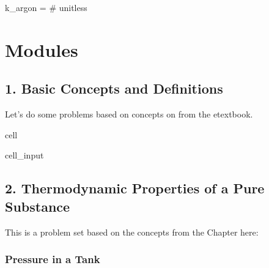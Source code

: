 \documentclass[letterpaper,10pt,english]{jupyterBook}
\begin{document}
\sphinxAtStartPar
k\_argon =   \# unitless

\sphinxstepscope


\part{Modules}

\sphinxstepscope


\chapter{1. Basic Concepts and Definitions}
\label{\detokenize{notebooks/Chapter1/chapter1:basic-concepts-and-definitions}}\label{\detokenize{notebooks/Chapter1/chapter1::doc}}
\sphinxAtStartPar
Let’s do some problems based on concepts on  from the e\sphinxhyphen{}textbook.

\sphinxstepscope

\begin{sphinxuseclass}{cell}\begin{sphinxVerbatimInput}

\begin{sphinxuseclass}{cell_input}
\begin{sphinxVerbatim}[commandchars=\\\{\}]
   
\end{sphinxVerbatim}

\end{sphinxuseclass}\end{sphinxVerbatimInput}

\end{sphinxuseclass}
\sphinxstepscope


\chapter{2. Thermodynamic Properties of a Pure Substance}
\label{\detokenize{notebooks/Chapter2/thermo-properties:thermodynamic-properties-of-a-pure-substance}}\label{\detokenize{notebooks/Chapter2/thermo-properties::doc}}
\sphinxAtStartPar
This is a problem set based on the concepts from the Chapter here: 

\sphinxstepscope


\section{Pressure in a Tank}
\label{\detokenize{notebooks/Chapter2/Problem_1_Pressure_in_a_Tank:pressure-in-a-tank}}\label{\detokenize{notebooks/Chapter2/Problem_1_Pressure_in_a_Tank::doc}}
\end{document}
